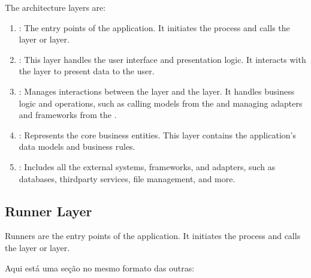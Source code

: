 \documentclass[letterpaper,10pt,english]{sphinxhowto}
\begin{document}
\sphinxAtStartPar
The architecture layers are:
\begin{enumerate}
%
\item {} 
\sphinxAtStartPar
{}: The entry points of the application. It initiates the process and calls the  layer or  layer.

\item {} 
\sphinxAtStartPar
{}: This layer handles the user interface and presentation logic. It interacts with the  layer to present data to the user.

\item {} 
\sphinxAtStartPar
{}: Manages interactions between the  layer and the  layer. It handles business logic and operations, such as calling models from the  and managing adapters and frameworks from the .

\item {} 
\sphinxAtStartPar
{}: Represents the core business entities. This layer contains the application’s data models and business rules.

\item {} 
\sphinxAtStartPar
{}: Includes all the external systems, frameworks, and adapters, such as databases, third\sphinxhyphen{}party services, file management, and more.

\end{enumerate}

\sphinxstepscope


\subsection{Runner Layer}
\label{\detokenize{architecture/runner/index:runner-layer}}\label{\detokenize{architecture/runner/index::doc}}
\sphinxAtStartPar
Runners are the entry points of the application. It initiates the process and calls the  layer or  layer.

\sphinxAtStartPar
Aqui está uma seção  no mesmo formato das outras:
\end{document}
